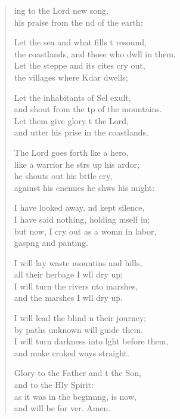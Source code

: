\begin{verse}
  \begin{patverse}
ing to the Lord  new song,\Med\\
his praise from the nd of the earth:

Let the sea and what fills \pointup{\i}t resound,\Med\\
the coastlands, and those who dwll in them.\\
Let the steppe and its cit\pointup{\i}es cry out,\Med\\
the villages where Kdar dwells;

Let the inhabitants of Sel exult,\Med\\
and shout from the tp of the mountains.\\
Let them give glory t the Lord,\Med\\
and utter his prise in the coastlands.

The Lord goes forth l\pointup{\i}ke a hero,\Med\\
like a warrior he st\pointup{\i}rs up his ardor;\\
he shouts out his bttle cry,\Med\\
against his enemies he shws his might:

I have looked away, nd kept silence,\Med\\
I have said nothing, holding mself in;\\
but now, I cry out as a womn in labor,\Med\\
gasp\pointup{\i}ng and panting.

I will lay waste mountins and hills,\Med\\
all their herbage I w\pointup{\i}ll dry up;\\
I will turn the rivers \pointup{\i}nto marshes,\Med\\
and the marshes I w\pointup{\i}ll dry up.

I will lead the blind n their journey;\Med\\
by paths unknown  will guide them.\\
I will turn darkness into l\pointup{\i}ght before them,\Med\\
and make croked ways straight.

Glory to the Father and t the Son,\Med\\
    and to the Hly Spirit:\\
as it was in the beginn\pointup{\i}ng, is now,\Med\\
    and will be for ver. Amen.
  \end{patverse}
\end{verse}
